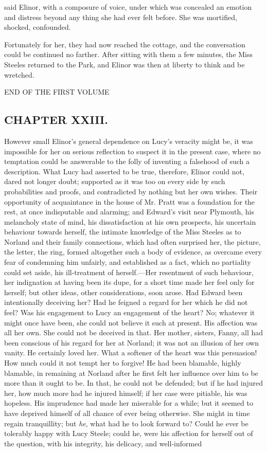  said Elinor, with a composure of voice, under which was concealed an emotion and distress beyond any thing she had ever felt before. She was mortified, shocked, confounded.

Fortunately for her, they had now reached the cottage, and the conversation could be continued no farther. After sitting with them a few minutes, the Miss Steeles returned to the Park, and Elinor was then at liberty to think and be wretched.

END OF THE FIRST VOLUME

\subsection[chapter-xxiii.]{\useURL[url23][][][]\from[url23]CHAPTER XXIII.}

However small Elinor's general dependence on Lucy's veracity might be, it was impossible for her on serious reflection to suspect it in the present case, where no temptation could be answerable to the folly of inventing a falsehood of such a description. What Lucy had asserted to be true, therefore, Elinor could not, dared not longer doubt; supported as it was too on every side by such probabilities and proofs, and contradicted by nothing but her own wishes. Their opportunity of acquaintance in the house of Mr. Pratt was a foundation for the rest, at once indisputable and alarming; and Edward's visit near Plymouth, his melancholy state of mind, his dissatisfaction at his own prospects, his uncertain behaviour towards herself, the intimate knowledge of the Miss Steeles as to Norland and their family connections, which had often surprised her, the picture, the letter, the ring, formed altogether such a body of evidence, as overcame every fear of condemning him unfairly, and established as a fact, which no partiality could set aside, his ill-treatment of herself.---Her resentment of such behaviour, her indignation at having been its dupe, for a short time made her feel only for herself; but other ideas, other considerations, soon arose. Had Edward been intentionally deceiving her? Had he feigned a regard for her which he did not feel? Was his engagement to Lucy an engagement of the heart? No; whatever it might once have been, she could not believe it such at present. His affection was all her own. She could not be deceived in that. Her mother, sisters, Fanny, all had been conscious of his regard for her at Norland; it was not an illusion of her own vanity. He certainly loved her. What a softener of the heart was this persuasion! How much could it not tempt her to forgive! He had been blamable, highly blamable, in remaining at Norland after he first felt her influence over him to be more than it ought to be. In that, he could not be defended; but if he had injured her, how much more had he injured himself; if her case were pitiable, his was hopeless. His imprudence had made her miserable for a while; but it seemed to have deprived himself of all chance of ever being otherwise. She might in time regain tranquillity; but {\em he}, what had he to look forward to? Could he ever be tolerably happy with Lucy Steele; could he, were his affection for herself out of the question, with his integrity, his delicacy, and well-informed 